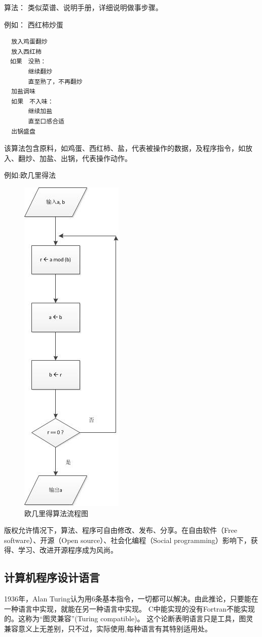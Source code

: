 算法： 类似菜谱、说明手册，详细说明做事步骤。

例如： 西红柿炒蛋
\begin{verbatim}
  放入鸡蛋翻炒
  放入西红柿
　如果　没熟：
　　　　继续翻炒
　　　　直至熟了，不再翻炒
  加盐调味
  如果　不入味：
　　　　继续加盐
　　　　直至口感合适
  出锅盛盘
\end{verbatim}
该算法包含原料，如鸡蛋、西红柿、盐，代表被操作的数据，及程序指令，如放入、翻炒、加盐、出锅，代表操作动作。

例如:欧几里得法
\begin{figure}
  \centering
  \includegraphics{diagrams/EuclideanAlgorithm.jpeg}
  \caption{欧几里得算法流程图}
  \label{Euclideanalgorithm}
\end{figure}
版权允许情况下，算法、程序可自由修改、发布、分享。在自由软件（Free software）、开源（Open source）、社会化编程（Social programming）影响下，获得、学习、改进开源程序成为风尚。
\subsection{计算机程序设计语言}
1936年，Alan Turing认为用6条基本指令，一切都可以解决。由此推论，只要能在一种语言中实现，就能在另一种语言中实现。 C中能实现的没有Fortran不能实现的。这称为“图灵兼容”(Turing compatible)。 这个论断表明语言只是工具，图灵兼容意义上无差别，只不过，实际使用,每种语言有其特别适用处。

